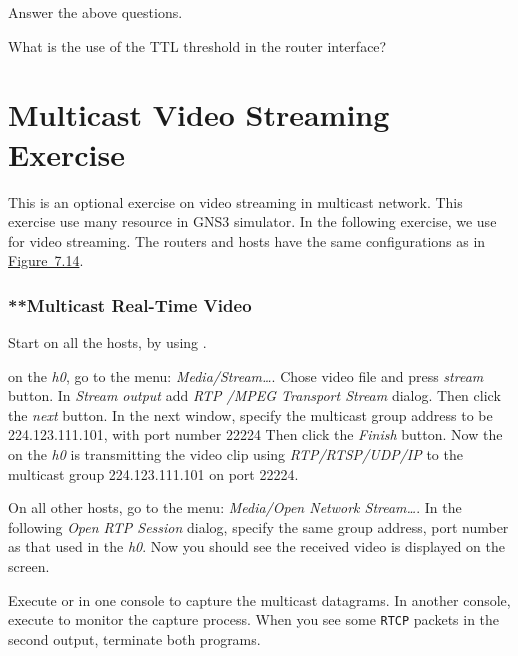 \documentclass{../UTNetLab}
\begin{document}
\begin{report}
    \item Answer the above questions.

    \item What is the use of the TTL threshold in the router interface?
\end{report}

\part{Multicast Video Streaming Exercise}
This is an optional exercise on video streaming in multicast network.
This exercise use many resource in GNS3 simulator.
In the following exercise, we use  for video streaming.
The routers and hosts have the same configurations as in \hyperref[fig:7.14]{Figure~7.14}.

\section{**Multicast Real-Time Video}
Start  on all the hosts, by using .

on the \textit{h0}, go to the  menu: \textit{Media/Stream\ldots }.
Chose video file  and press \textit{stream} button.
In \textit{Stream output} add \textit{RTP /MPEG Transport Stream} dialog.
Then click the \textit{next} button.
In the next window, specify the multicast group address to be {224.123.111.101}, with port number {22224} %
Then click the \textit{Finish} button.
Now the  on the \textit{h0} is transmitting the video clip using \textit{RTP/RTSP/UDP/IP} to the multicast group {224.123.111.101} on port {22224}.

On all other hosts, go to the  menu: \textit{Media/Open Network Stream\ldots}.
In the following \textit{Open RTP Session} dialog, specify the same group address, port number as that used in the \textit{h0}.%
Now you should see the received video is displayed on the screen.

Execute  or  in one console to capture the multicast datagrams.
In another console, execute  to monitor the capture process.
When you see some \texttt{RTCP} packets in the second  output, terminate both  programs.
\end{document}
